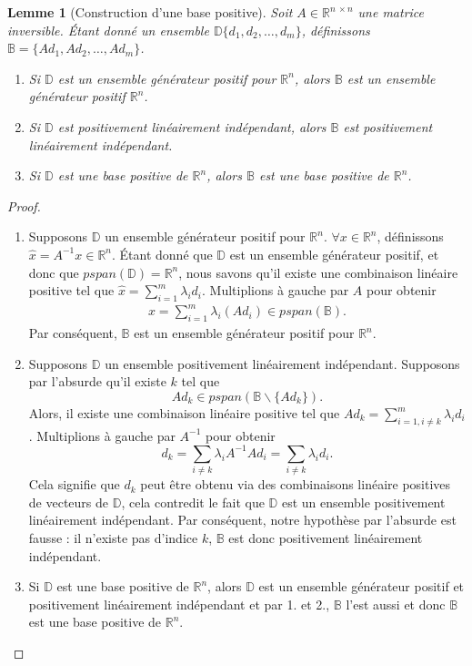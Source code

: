 \documentclass[french]{report}
\newtheorem{lem}{Lemme}[section]
\newcommand{\preuve}[1]{\begin{proof} #1 \end{proof}}
\newcommand{\lemme}[2]{\begin{lem}[#1] #2 \end{lem}}
\newcommand{\D}{\mathbb{D}}
\begin{document}
\lemme{Construction d'une base positive}
{
    Soit $A \in \mathbb{R}^{n\ \times n}$ une matrice inversible. Étant donné un ensemble $\D \{d_1,d_2,\dots,d_m\}$, définissons $\mathbb{B} = \{Ad_1,Ad_2,\dots,Ad_m\}$.
    \begin{enumerate}
        \item Si $\D$ est un ensemble générateur positif pour $\mathbb{R}^n$, alors $\mathbb{B}$ est un ensemble générateur positif $\mathbb{R}^n$.
        \item Si $\D$ est positivement linéairement indépendant, alors $\mathbb{B}$ est positivement linéairement indépendant.
        \item Si $\D$ est une base positive de $\mathbb{R}^n$, alors $\mathbb{B}$ est une base positive de $\mathbb{R}^n$.
    \end{enumerate}
}\label{lemme:construction base positive}
\preuve
{
    \begin{enumerate}
        \item Supposons $\D$ un ensemble générateur positif pour $\mathbb{R}^n$. $\forall x \in \mathbb{R}^n $, définissons $\hat{x} = A^{-1}x \in \mathbb{R}^n$. Étant donné que $\D$ est un ensemble générateur positif, et donc que $pspan(\D) = \mathbb{R}^n$, nous savons qu'il existe une combinaison linéaire positive tel que $\hat{x} = \sum_{i=1}^m \lambda_i d_i$. Multiplions à gauche par $A$ pour obtenir
              \begin{align*}
                  x = \sum_{i=1}^m \lambda_i (A d_i) \in  pspan(\mathbb{B}).
              \end{align*}
              Par conséquent, $\mathbb{B}$ est un ensemble générateur positif pour $\mathbb{R}^n$.

        \item Supposons $\D$ un ensemble positivement linéairement indépendant. Supposons par l'absurde qu'il existe $k$ tel que
              $$
                  A d_k \in pspan(\mathbb{B}\backslash \{ A d_k \}).
              $$
              Alors, il existe une combinaison linéaire positive tel que $A d_k = \sum_{i=1, i \neq k}^m \lambda_i d_i$. Multiplions à gauche par $A^{-1}$ pour obtenir
              $$
                  d_k = \sum_{i \neq k} \lambda_i A^{-1} A d_i = \sum_{i \neq k} \lambda_i d_i.
              $$
              Cela signifie que $d_k$ peut être obtenu via des combinaisons linéaire positives de vecteurs de $\D$, cela contredit le fait que $\D$ est un ensemble positivement linéairement indépendant. Par conséquent, notre hypothèse par l'absurde est fausse : il n'existe pas d'indice $k$, $\mathbb{B}$ est donc positivement linéairement indépendant.

        \item Si $\D$ est une base positive de $\mathbb{R}^n$, alors $\D$ est un ensemble générateur positif et positivement linéairement indépendant et par 1. et 2., $\mathbb{B}$ l'est aussi et donc $\mathbb{B}$ est une base positive de $\mathbb{R}^n$.
    \end{enumerate}
}
\end{document}
